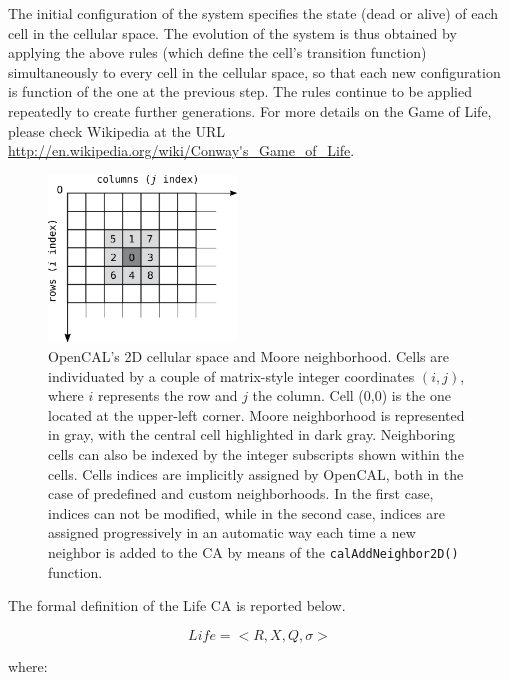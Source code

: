 The initial configuration of the system specifies the state (dead or
alive) of each cell in the cellular space. The evolution of the
system is thus obtained by applying the above rules (which define the
cell's transition function) simultaneously to every cell in the
cellular space, so that each new configuration is function of the one
at the previous step. The rules continue to be applied repeatedly to
create further generations. For more details on the Game of Life,
please check Wikipedia at the URL
\url{http://en.wikipedia.org/wiki/Conway's_Game_of_Life}.

\begin{figure}
  \begin{center}
    \includegraphics[width=5cm]{./images/OpenCAL/LifeNeighborhood.png}
    \caption{OpenCAL's 2D cellular space and Moore neighborhood. Cells
      are individuated by a couple of matrix-style integer coordinates
      $(i, j)$, where $i$ represents the row and $j$ the column. Cell
      (0,0) is the one located at the upper-left corner. Moore
      neighborhood is represented in gray, with the central cell
      highlighted in dark gray. Neighboring cells can also be indexed by
      the integer subscripts shown within the cells. Cells indices are
      implicitly assigned by OpenCAL, both in the case of predefined
      and custom neighborhoods. In the first case, indices can not be
      modified, while in the second case, indices are assigned
      progressively in an automatic way each time a new neighbor is added
      to the CA by means of the \texttt{calAddNeighbor2D()} function.}
    \label{fig:LifeNeighborhood}
  \end{center}
\end{figure}

The formal definition of the Life CA is reported below.

$$Life = < R, X, Q, \sigma >$$

where:

